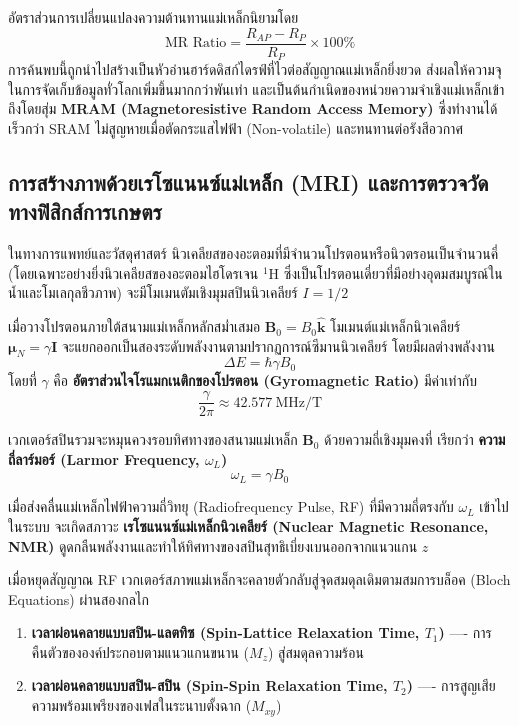 อัตราส่วนการเปลี่ยนแปลงความต้านทานแม่เหล็กนิยามโดย
\begin{equation}
\text{MR Ratio} = \frac{R_{AP} - R_P}{R_P} \times 100\%
\end{equation}
การค้นพบนี้ถูกนำไปสร้างเป็นหัวอ่านฮาร์ดดิสก์ไดรฟ์ที่ไวต่อสัญญาณแม่เหล็กยิ่งยวด ส่งผลให้ความจุในการจัดเก็บข้อมูลทั่วโลกเพิ่มขึ้นมากกว่าพันเท่า และเป็นต้นกำเนิดของหน่วยความจำเชิงแม่เหล็กเข้าถึงโดยสุ่ม \textbf{MRAM (Magnetoresistive Random Access Memory)} ซึ่งทำงานได้เร็วกว่า SRAM ไม่สูญหายเมื่อตัดกระแสไฟฟ้า (Non-volatile) และทนทานต่อรังสีอวกาศ

\subsection{การสร้างภาพด้วยเรโซแนนซ์แม่เหล็ก (MRI) และการตรวจวัดทางฟิสิกส์การเกษตร}
ในทางการแพทย์และวัสดุศาสตร์ นิวเคลียสของอะตอมที่มีจำนวนโปรตอนหรือนิวตรอนเป็นจำนวนคี่ (โดยเฉพาะอย่างยิ่งนิวเคลียสของอะตอมไฮโดรเจน $^1\text{H}$ ซึ่งเป็นโปรตอนเดี่ยวที่มีอย่างอุดมสมบูรณ์ในน้ำและโมเลกุลชีวภาพ) จะมีโมเมนตัมเชิงมุมสปินนิวเคลียร์ $I = 1/2$

เมื่อวางโปรตอนภายใต้สนามแม่เหล็กหลักสม่ำเสมอ $\mathbf{B}_0 = B_0 \hat{\mathbf{k}}$ โมเมนต์แม่เหล็กนิวเคลียร์ $\boldsymbol{\mu}_N = \gamma \mathbf{I}$ จะแยกออกเป็นสองระดับพลังงานตามปรากฏการณ์ซีมานนิวเคลียร์ โดยมีผลต่างพลังงาน
\begin{equation}
\Delta E = \hbar \gamma B_0
\end{equation}
โดยที่ $\gamma$ คือ \textbf{อัตราส่วนไจโรแมกเนติกของโปรตอน (Gyromagnetic Ratio)} มีค่าเท่ากับ
\begin{equation}
\frac{\gamma}{2\pi} \approx 42.577~\text{MHz/T}
\end{equation}

เวกเตอร์สปินรวมจะหมุนควงรอบทิศทางของสนามแม่เหล็ก $\mathbf{B}_0$ ด้วยความถี่เชิงมุมคงที่ เรียกว่า \textbf{ความถี่ลาร์มอร์ (Larmor Frequency, $\omega_L$)}
\begin{equation}
\omega_L = \gamma B_0
\label{eq:larmor_frequency}
\end{equation}

เมื่อส่งคลื่นแม่เหล็กไฟฟ้าความถี่วิทยุ (Radiofrequency Pulse, RF) ที่มีความถี่ตรงกับ $\omega_L$ เข้าไปในระบบ จะเกิดสภาวะ \textbf{เรโซแนนซ์แม่เหล็กนิวเคลียร์ (Nuclear Magnetic Resonance, NMR)} ดูดกลืนพลังงานและทำให้ทิศทางของสปินสุทธิเบี่ยงเบนออกจากแนวแกน $z$

เมื่อหยุดสัญญาณ RF เวกเตอร์สภาพแม่เหล็กจะคลายตัวกลับสู่จุดสมดุลเดิมตามสมการบล็อค (Bloch Equations) ผ่านสองกลไก
\begin{enumerate}
    \item \textbf{เวลาผ่อนคลายแบบสปิน-แลตทิซ (Spin-Lattice Relaxation Time, $T_1$)} ---- การคืนตัวขององค์ประกอบตามแนวแกนขนาน ($M_z$) สู่สมดุลความร้อน
    \item \textbf{เวลาผ่อนคลายแบบสปิน-สปิน (Spin-Spin Relaxation Time, $T_2$)} ---- การสูญเสียความพร้อมเพรียงของเฟสในระนาบตั้งฉาก ($M_{xy}$)
\end{enumerate}

